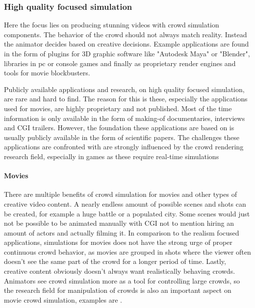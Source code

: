 \documentclass{acmsiggraph}               %
\begin{document}
\subsubsection{High quality focused simulation}
Here the focus lies on producing stunning videos with crowd simulation components. The behavior of the crowd should not always match reality. Instead the animator decides based on creative decisions. Example applications are found in the form of plugins for 3D graphic software like "Autodesk Maya" or "Blender", libraries in pc or console games and finally as proprietary render engines and tools for movie blockbusters.

Publicly available applications and research, on high quality focused simulation, are rare and hard to find. The reason for this is these, especially the applications used for movies, are highly proprietary and not published. Most of the time information is only available in the form of making-of documentaries, interviews and CGI trailers. 
However, the foundation these applications are based on is usually publicly available in the form of scientific papers. The challenges these applications are confronted with are strongly influenced by the crowd rendering research field, especially in games as these require real-time simulations %

\paragraph{Movies}

There are multiple benefits of crowd simulation for movies and other types of creative video content. A nearly endless amount of possible scenes and shots can be created, for example a huge battle or a populated city. Some scenes would just not be possible to be animated manually with CGI not to mention hiring an amount of actors and actually filming it. In comparison to the realism focused applications, simulations for movies does not have the strong urge of proper continuous crowd behavior, as movies are grouped in shots where the viewer often doesn't see the same part of the crowd for a longer period of time. Lastly, creative content obviously doesn't always want realistically behaving crowds. Animators see crowd simulation more as a tool for controlling large crowds, so the research field for manipulation of crowds is also an important aspect on movie crowd simulation,  examples are \cite{kim_interactive_2014} \cite{ulicny_crowdbrush_2004}.
\end{document}
